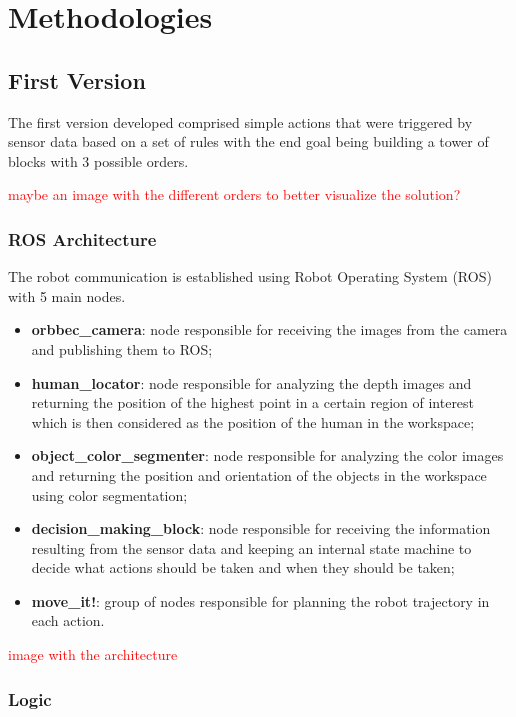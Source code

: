 \chapter{Methodologies}
\label{chapter:methologies}

\section{First Version}

The first version developed comprised simple actions that were triggered by sensor data based on a set of rules with the end goal being building a tower of blocks with 3 possible orders.

\textcolor{red}{maybe an image with the different orders to better visualize the solution?}

\subsection{ROS Architecture}

The robot communication is established using Robot Operating System (ROS) with 5 main nodes.

\begin{itemize}
    \item \textbf{orbbec\_camera}: node responsible for receiving the images from the camera and publishing them to ROS;
    \item \textbf{human\_locator}: node responsible for analyzing the depth images and returning the position of the highest point in a certain region of interest which is then considered as the position of the human in the workspace;
    \item \textbf{object\_color\_segmenter}: node responsible for analyzing the color images and returning the position and orientation of the objects in the workspace using color segmentation;
    \item \textbf{decision\_making\_block}: node responsible for receiving the information resulting from the sensor data and keeping an internal state machine to decide what actions should be taken and when they should be taken;
    \item \textbf{move\_it!}: group of nodes responsible for planning the robot trajectory in each action.
\end{itemize}

\textcolor{red}{image with the architecture}

\subsection{Logic}

